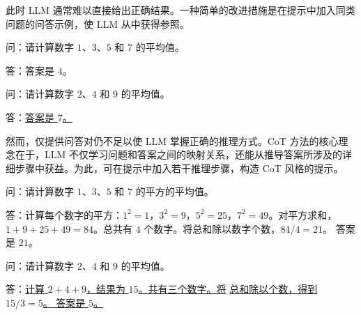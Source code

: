 此时 LLM 通常难以直接给出正确结果。一种简单的改进措施是在提示中加入同类问题的问答示例，使 LLM 从中获得参照。

\vspace{0.5em}
\begin{tcolorbox}
\begingroup
\setlength{\leftskip}{2em}
\setlength{\rightskip}{2em}

问：请计算数字 $1$、$3$、$5$ 和 $7$ 的平均值。

\vspace{0.3em}

答：答案是 $4$。

\vspace{0.7em}

问：请计算数字 $2$、$4$ 和 $9$ 的平均值。

\vspace{0.3em}

答：\underline{答案是 $7$。}

\endgroup
\end{tcolorbox}
\vspace{0.5em}

然而，仅提供问答对仍不足以使 LLM 掌握正确的推理方式。CoT 方法的核心理念在于，LLM 不仅学习问题和答案之间的映射关系，还能从推导答案所涉及的详细步骤中获益。为此，可在提示中加入若干推理步骤，构造 CoT 风格的提示。

\vspace{0.5em}
\begin{tcolorbox}
\begingroup
\setlength{\leftskip}{2em}
\setlength{\rightskip}{2em}

问：请计算数字 $1$、$3$、$5$ 和 $7$ 的平方的平均值。

\vspace{0.3em}

答：\textcolor[RGB]{46,125,50}{计算每个数字的平方：$1^2 = 1$，$3^2=9$，$5^2=25$，$7^2=49$。对平方求和，$1+9+25+49=84$。总共有 $4$ 个数字。将总和除以数字个数，$84 / 4 = 21$。} 答案是 $21$。

\vspace{0.7em}

问：请计算数字 $2$、$4$ 和 $9$ 的平均值。

\vspace{0.3em}

答：\underline{\textcolor[RGB]{46,125,50}{计算 $2 + 4 + 9$，结果为 $15$。共有三个数字。将}}
\underline{\textcolor[RGB]{46,125,50}{总和除以个数，得到 $15/3=5$。} 答案是 $5$。}

\endgroup
\end{tcolorbox}
\vspace{0.5em}

